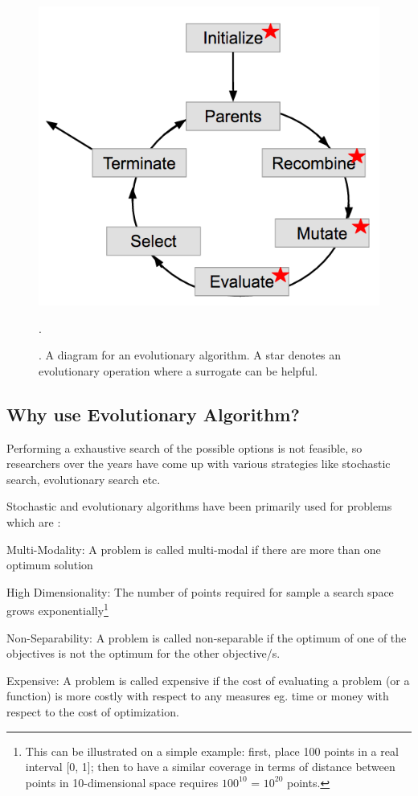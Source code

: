 \documentclass{newsig}
\begin{document}
 \begin{figure}[tbh]
\centering
\includegraphics[width=0.9\columnwidth]{Figures/EA_Diagram}
\caption{. A diagram for an evolutionary algorithm.
A star denotes an evolutionary operation where a surrogate can be helpful.}.
\label{fig:ea_figure}
\end{figure}

 \subsection*{Why use Evolutionary Algorithm?}\label{section:whyea}
 Performing a exhaustive search of the possible options is not feasible, so researchers over the years have come up with various strategies like stochastic search, evolutionary search etc. 
 
 Stochastic and evolutionary algorithms have been primarily used for problems which are :
 \begin{compactitem}
     \item{Multi-Modality: A problem is called multi-modal if there are more than one optimum solution}
     \item{High Dimensionality: The number of points required for sample a search space grows exponentially\footnote{This can be illustrated on a simple example: first, place 100 points
    in a real interval [0, 1]; then to have a similar coverage in terms of distance between
    points in 10-dimensional space requires $100^{10}$ = $10^{20}$ points.}}
    \item{Non-Separability: A problem is called non-separable if the optimum of one of the objectives is not the optimum for the other objective/s.}
    \item{Expensive: A problem is called expensive if the cost of evaluating a problem (or a function) is more costly with respect to any measures eg. time or money with respect to the cost of optimization.}
  \end{compactitem}
 
\end{document}
